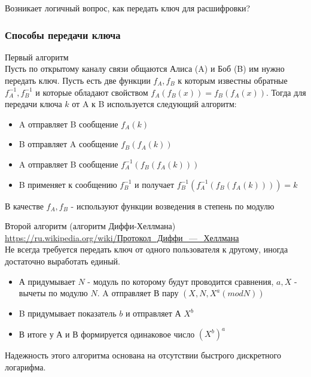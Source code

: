 Возникает логичный вопрос, как передать ключ для расшифровки? \\

\subsubsection{Способы передачи ключа}

Первый алгоритм \\
Пусть по открытому каналу связи общаются Алиса (A) и Боб (B) им нужно передать ключ. Пусть есть две функции $f_{A}, f_{B}$ к которым известны обратные $f^{-1}_{A}, f^{-1}_{B}$ и которые обладают свойством $f_{A} (f_{B} (x)) = f_{B} (f_{A} (x))$. Тогда для передачи ключа $k$ от A к B используется следующий алгоритм:
\begin {itemize}
\item A отправляет B сообщение $f_{A} (k)$ 
\item B отправляет A сообщение $f_{B}(f_{A} (k))$
\item A отправляет B сообщение $f^{-1}_{A}(f_{B}(f_{A} (k)))$
\item B применяет к сообщению $f^{-1}_{B}$ и получает $f^{-1}_{B}(f^{-1}_{A}(f_{B}(f_{A} (k)))) = k$
\end {itemize}
В качестве $f_{A}, f_{B}$ - используют функции возведения в степень по модулю

Второй алгоритм (алгоритм Диффи-Хеллмана) \\
\url{https://ru.wikipedia.org/wiki/Протокол_Диффи_—_Хеллмана} \\
Не всегда требуется передать ключ от одного пользователя к другому, иногда достаточно выработать единый. 
\begin {itemize}
\item А придумывает $N$ - модуль по которому будут проводится сравнения, $a, X$ - вычеты по модулю $N$. A отправляет В пару $(X, N, X^{a} (mod N))$
\item B придумывает показатель $b$ и отправляет А $X^{b}$
\item В итоге у А и В формируется одинаковое число $\left( X^{b} \right)^{a}$
\end {itemize}
Надежность этого алгоритма основана на отсутствии быстрого дискретного логарифма.

